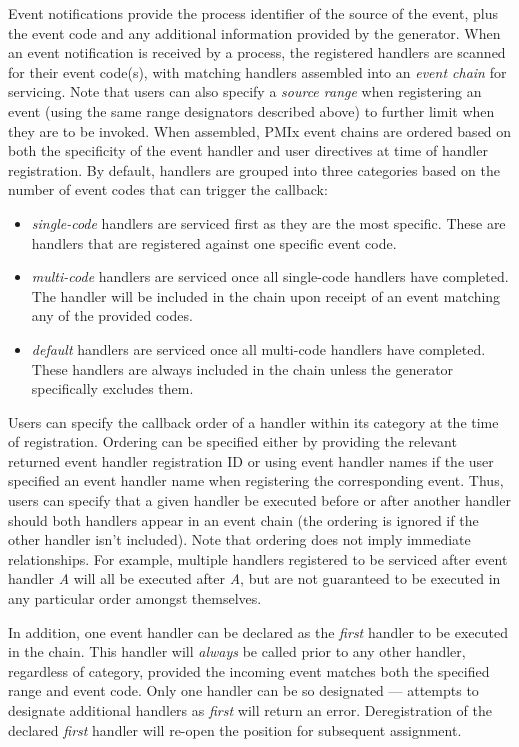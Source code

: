 Event notifications provide the process identifier of the source of the event, plus the event code and any additional information provided by the generator. When an event notification is received by a process, the registered handlers are scanned for their event code(s), with matching handlers assembled into an \textit{event chain} for servicing. Note that users can also specify a \textit{source range} when registering an event (using the same range designators described above) to further limit when they are to be invoked. When assembled, PMIx event chains are ordered based on both the specificity of the event handler and user directives at time of handler registration. By default, handlers are grouped into three categories based on the number of event codes that can trigger the callback:
\begin{itemize}
\item \textit{single-code} handlers are serviced first as they are the most specific. These are handlers that are registered against one specific event code.

\item \textit{multi-code} handlers are serviced once all single-code handlers have completed. The handler will be included in the chain upon receipt of an event matching any of the provided codes.

\item \textit{default} handlers are serviced once all multi-code handlers have completed. These handlers are always included in the chain unless the generator specifically excludes them.
\end{itemize}

Users can specify the callback order of a handler within its category at the time of registration. Ordering can be specified either by providing the relevant returned event handler registration ID or using event handler names if the user specified an event handler name when registering the corresponding event. Thus, users can specify that a given handler be executed before or after another handler should both handlers appear in an event chain (the ordering is ignored if the other handler isn't included). Note that ordering does not imply immediate relationships. For example, multiple handlers registered to be serviced after event handler \textit{A} will all be executed after \textit{A}, but are not guaranteed to be executed in any particular order amongst themselves.

In addition, one event handler can be declared as the \textit{first} handler to be executed in the chain. This handler will \textit{always} be called prior to any other handler, regardless of category, provided the incoming event matches both the specified range and event code. Only one handler can be so designated --- attempts to designate additional handlers as \textit{first} will return an error. Deregistration of the declared \textit{first} handler will re-open the position for subsequent assignment.

